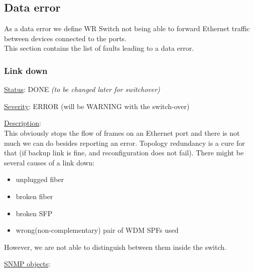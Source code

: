 \newpage
\subsection{Data error}
As a data error we define WR Switch not being able to forward Ethernet traffic
between devices connected to the ports.\\

\noindent This section contains the list of faults leading to a data error.

\subsubsection{\bf Link down}
		\label{fail:data:link_down}
		\begin{pck_descr}
			\item [] \underline{Status}: DONE  \emph{(to be changed later for switchover)}
			\item [] \underline{Severity}: ERROR (will be WARNING with the
				switch-over)
			\item [] \underline{Description}:\\
				This obviously stops the flow of frames on an Ethernet port and there is
				not much we can do besides reporting an error. Topology redundancy is a
				cure for that (if backup link is fine, and reconfiguration does not
				fail). There might be several causes of a link down:
				\begin{itemize}
					\item unplugged fiber
					\item broken fiber
					\item broken SFP
					\item wrong(non-complementary) pair of WDM SPFs used
				\end{itemize}
				However, we are not able to distinguish between them inside the switch.
			\item [] \underline{SNMP objects}:\\
				\\
				\\
				\\
				\\
		\end{pck_descr}

